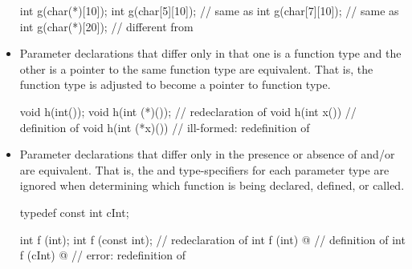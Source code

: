 \begin{note}
\begin{itemize}
\begin{example}
\begin{codeblock}
int g(char(*)[10]);
int g(char[5][10]);             // same as 
int g(char[7][10]);             // same as 
int g(char(*)[20]);             // different from 
\end{codeblock}
\end{example}

\item
{}%
%
Parameter declarations that differ only in that one is a function type
and the other is a pointer to the same function type are equivalent.
That is, the function type is adjusted to become a pointer to function type.
\begin{example}
\begin{codeblock}
void h(int());
void h(int (*)());              // redeclaration of 
void h(int x()) { }             // definition of 
void h(int (*x)()) { }          // ill-formed: redefinition of 
\end{codeblock}
\end{example}

\item
{}%
%
Parameter declarations that differ only in the presence or absence of
and/or
are equivalent.
That is, the
and
type-specifiers for
each parameter type are ignored when determining which function is being
declared,
defined, or called.
\begin{example}
\begin{codeblock}
typedef const int cInt;

int f (int);
int f (const int);              // redeclaration of 
int f (int) { @\commentellip@ }       // definition of 
int f (cInt) { @\commentellip@ }      // error: redefinition of 
\end{codeblock}
\end{example}


\end{itemize}
\end{note}
